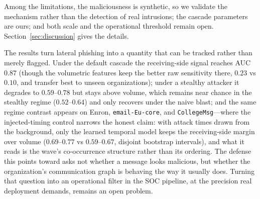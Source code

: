 Among the limitations, the maliciousness is synthetic, so we validate the mechanism rather than the detection
of real intrusions; the cascade parameters are ours; and both scale and the operational threshold remain open.
Section~\ref{sec:discussion} gives the details.

The results turn lateral phishing into a quantity that can be tracked rather than merely flagged. Under the
default cascade the receiving-side signal reaches AUC $0.87$ (though the volumetric features keep the
better raw sensitivity there, $0.23$ vs $0.10$, and transfer best to unseen organizations); under a
stealthy attacker it degrades to
$0.59$--$0.78$ but stays above volume, which remains near chance in the stealthy regime ($0.52$--$0.64$) and
only recovers under the naive blast;
and the same regime contrast appears on Enron, \texttt{email-Eu-core}, and
\texttt{CollegeMsg}---where the injected-timing control narrows the honest claim: with attack times drawn
from the background, only the learned temporal model keeps the receiving-side margin over volume
($0.69$--$0.77$ vs $0.59$--$0.67$, disjoint bootstrap intervals), and what it reads is the wave's
co-occurrence structure rather than its ordering. The defense this points toward
asks not whether a message looks malicious, but whether the organization's communication graph is behaving
the way it usually does. Turning that question into an operational filter in the SOC pipeline, at the
precision real deployment demands, remains an open problem.
